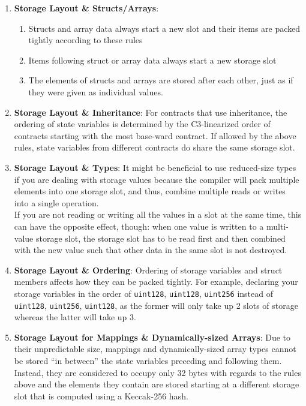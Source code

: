 \begin{enumerate}
\item\textbf{Storage Layout \& Structs/Arrays}:
    \begin{enumerate}
	\item Structs and array data always start a new slot and their items are packed tightly according to these rules
	\item Items following struct or array data always start a new storage slot
	\item The elements of structs and arrays are stored after each other, just as if they were given as individual values.
    \end{enumerate}

\item\textbf{Storage Layout \& Inheritance}: For contracts that use inheritance, the ordering of state variables is determined by the C3-linearized order of contracts starting with the most base-ward contract. If allowed by the above rules, state variables from different contracts do share the same storage slot.

\item\textbf{Storage Layout \& Types}: It might be beneficial to use reduced-size types if you are dealing with storage values because the compiler will pack multiple elements into one storage slot, and thus, combine multiple reads or writes into a single operation.\\
If you are not reading or writing all the values in a slot at the same time, this can have the opposite effect, though: when one value is written to a multi-value storage slot, the storage slot has to be read first and then combined with the new value such that other data in the same slot is not destroyed.

\item\textbf{Storage Layout \& Ordering}: Ordering of storage variables and struct members affects how they can be packed tightly. For example, declaring your storage variables in the order of \verb|uint128|, \verb|uint128|, \verb|uint256| instead of \verb|uint128|, \verb|uint256|, \verb|uint128|, as the former will only take up 2 slots of storage whereas the latter will take up 3.

\item\textbf{Storage Layout for Mappings \& Dynamically-sized Arrays}: Due to their unpredictable size, mappings and dynamically-sized array types cannot be stored “in between” the state variables preceding and following them. Instead, they are considered to occupy only 32 bytes with regards to the rules above and the elements they contain are stored starting at a different storage slot that is computed using a Keccak-256 hash.


\end{enumerate}
